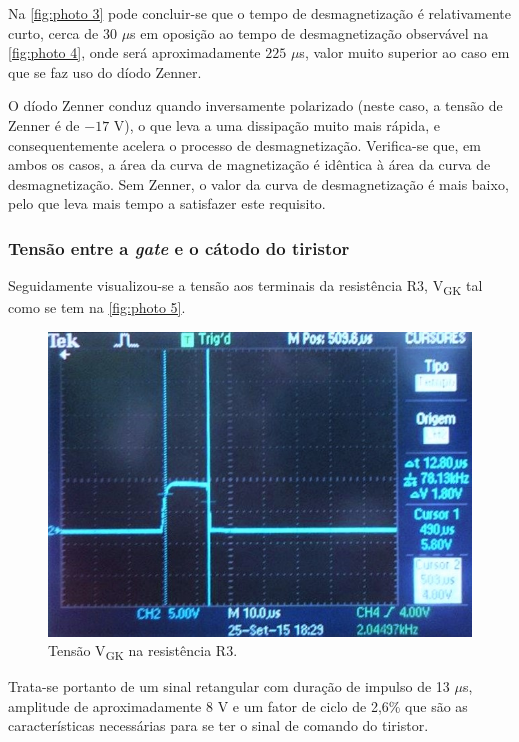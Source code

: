 \documentclass[a4paper,11pt]{article}
\numberwithin{equation}{section}
\begin{document}
Na \autoref{fig:photo 3} pode concluir-se que o tempo de desmagnetização é relativamente curto, cerca de $30$ $\mu$s em oposição ao tempo de desmagnetização observável na \autoref{fig:photo 4}, onde será aproximadamente $225$ $\mu$s, valor muito superior ao caso em que se faz uso do díodo Zenner.

O díodo Zenner conduz quando inversamente polarizado (neste caso, a tensão de Zenner é de $-17$ V), o que leva a uma dissipação muito mais rápida, e consequentemente acelera o processo de desmagnetização. Verifica-se que, em ambos os casos, a área da curva de magnetização é idêntica à área da curva de desmagnetização. Sem Zenner, o valor da curva de desmagnetização é mais baixo, pelo que leva mais tempo a satisfazer este requisito. 

\subsubsection{Tensão entre a \textit{gate} e o cátodo do tiristor}

Seguidamente visualizou-se a tensão aos terminais da resistência R$3$,  V\textsubscript{GK} tal como se tem na \autoref{fig:photo 5}.

\begin{figure}[h]
	\centering
	\includegraphics[keepaspectratio=true, scale=0.67]{img/fig8}
	\caption{Tensão V\textsubscript{GK} na resistência R$3$.}
	\label{fig:photo 5}
	\vspace{-0.8em}
\end{figure}

Trata-se portanto de um sinal retangular com duração de impulso de 13 $\mu$s, amplitude de aproximadamente 8 V e um fator de ciclo de 2,6\% que são as características necessárias para se ter o sinal de comando do tiristor.
\end{document}
